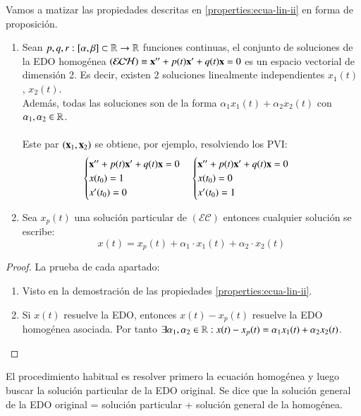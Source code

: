 \begin{pro}[Estructura de soluciones de la $(\mathcal{EC}) \equiv \mbf{x}'' + p(t)\mbf{x}' + q(t)\mbf{x} = r(t)$] %
    Vamos a matizar las propiedades descritas en \ref{properties:ecua-lin-ii} en forma de proposición.
    \begin{enumerate}
        \item Sean $p, q, r : [\alpha, \beta] \subset \mathbb{R} \to \mathbb{R}$ funciones continuas, el conjunto de soluciones de la EDO homogénea $(\mathcal{EC H}) \equiv \mathbf{x}'' + p(t)\mathbf{x}' + q(t)\mathbf{x} = 0$ es un espacio vectorial de dimensión 2. Es decir, existen 2 soluciones linealmente independientes $x_1(t)$, $x_2(t)$.\\Además, todas las soluciones son de la forma $\alpha_1  x_1(t) + \alpha_2 x_2(t)$ con $\alpha_1, \alpha_2 \in \mathbb{R}$.\\\\
            Este par $(\mathbf{x}_1, \mathbf{x}_2)$ se obtiene, por ejemplo, resolviendo los PVI:
            $$
                \begin{cases}
                    \mathbf{x}''+p(t)\mathbf{x}'+q(t)\mathbf{x}=0\\
                    x(t_0)=1\\
                    x'(t_0)=0
                \end{cases}
                \begin{cases}
                    \mathbf{x}''+p(t)\mathbf{x}'+q(t)\mathbf{x}=0\\
                    x(t_0)=0\\
                    x'(t_0)=1
                \end{cases}
            $$
            \item Sea $x_p(t)$ una solución particular de $(\mathcal{EC})$ entonces cualquier solución se escribe:
            $$
                x(t) = x_p(t) + \alpha_1 \cdot x_1(t) + \alpha_2 \cdot x_2(t)
            $$
    \end{enumerate}
\end{pro}
\begin{proof}
    La prueba de cada apartado:\\
    \begin{enumerate}
        \item Visto en la demostración de las propiedades \ref{properties:ecua-lin-ii}.
        \item Si $x(t)$ resuelve la EDO, entonces $x(t) - x_p(t)$ resuelve la EDO homogénea asociada. Por tanto $\exists \alpha_1, \alpha_2 \in \mathbb{R} : x(t) - x_p(t) = \alpha_1 x_1(t) + \alpha_2 x_2(t)$.
    \end{enumerate}
\end{proof}
\begin{obs}
    El procedimiento habitual es resolver primero la ecuación homogénea y luego buscar la solución particular de la EDO original. Se dice que la solución general de la EDO original = solución particular + solución general de la homogénea.
\end{obs}
